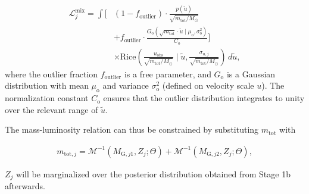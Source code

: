 \begin{equation}
\begin{aligned}
\mathcal{L}^{\mathrm{mix}}_j
= \int \Biggl[
& (1-f_{\mathrm{outlier}}) \cdot \frac{p(\tilde{u})}{\sqrt{m_{\mathrm{tot}}/M_{\odot}}} \\
& + f_{\mathrm{outlier}} \cdot
\frac{G_{\mathrm{o}}(\sqrt{m_{\mathrm{tot}}} \cdot \tilde{u}\mid\mu_{\mathrm{o}},\sigma_{\mathrm{o}}^2)}
{C_{\mathrm{o}}}
\Biggr] \\
& \times \mathrm{Rice}\left(
\frac{u_{\mathrm{obs}}}{\sqrt{m_{\mathrm{tot}}/M_{\odot}}}
\mid \tilde{u},
\frac{\sigma_{u,j}}{\sqrt{m_{\mathrm{tot}}/M_{\odot}}}
\right)\,d\tilde{u},
\end{aligned}
\end{equation}
where the outlier fraction $f_{\mathrm{outlier}}$ is a free parameter, and $G_{\mathrm{o}}$ is a Gaussian distribution with mean $\mu_{\mathrm{o}}$ and variance $\sigma_{\mathrm{o}}^2$ (defined on velocity scale $u$). The normalization constant $C_{\mathrm{o}}$ ensures that the outlier distribution integrates to unity over the relevant range of $\tilde{u}$.

The mass-luminosity relation can thus be constrained by substituting $m_{\mathrm{tot}}$ with

\begin{align}
    m_{\mathrm{tot},j} = \mathcal{M}^{-1}(M_{\mathrm{G},j1},Z_{j};\Theta) + \mathcal{M}^{-1}(M_{\mathrm{G},j2},Z_{j};\Theta),
\end{align}

$Z_j$ will be marginalized over the posterior distribution obtained from Stage 1b afterwards.




